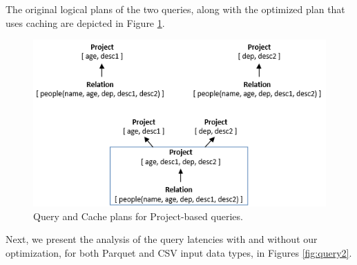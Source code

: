 The original logical plans of the two queries, along with the optimized plan that uses caching are depicted in Figure \ref{fig:query2_plans}.

\begin{figure}[ht]
   \centering
   \includegraphics[scale=0.5]{figures/query2_cacheplan}
   \caption{Query and Cache plans for Project-based queries.} 
   \label{fig:query2_plans}
\end{figure}

Next, we present the analysis of the query latencies with and without our optimization, for both Parquet and CSV input data types, in Figures \ref{fig:query2}.

